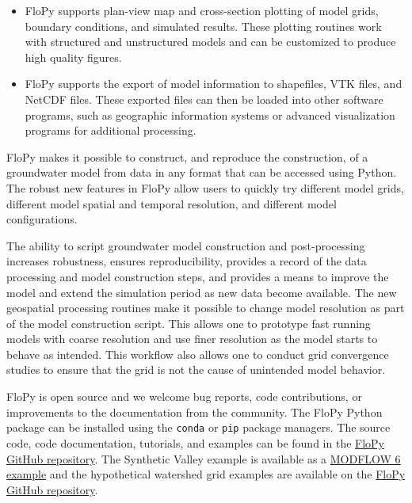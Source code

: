\documentclass[12pt, oneside]{article}  	%
\begin{document}
\begin{itemize}
\item FloPy supports plan-view map and cross-section plotting of model grids, boundary conditions, and simulated results. These plotting routines work with structured and unstructured models and can be customized to produce high quality figures.

\item FloPy supports the export of model information to shapefiles, VTK files, and NetCDF files. These exported files can then be loaded into other software programs, such as geographic information systems or advanced visualization programs for additional processing.

\end{itemize}

FloPy makes it possible to construct, and reproduce the construction, of a groundwater model from data in any format that can be accessed using Python. The robust new features in FloPy allow users to quickly try different model grids, different model spatial and temporal resolution, and different model configurations. 

The ability to script groundwater model construction and post-processing increases robustness, ensures reproducibility, provides a record of the data processing and model construction steps, and provides a means to improve the model and extend the simulation period as new data become available. The new geospatial processing routines make it possible to change model resolution as part of the model construction script. This allows one to prototype fast running models with coarse resolution and use finer resolution as the model starts to behave as intended. This workflow also allows one to conduct grid convergence studies to ensure that the grid is not the cause of unintended model behavior.

FloPy is open source and we welcome bug reports, code contributions, or improvements to the documentation from the community. The FloPy Python package can be installed using the \texttt{conda} or \texttt{pip} package managers. The source code, code documentation, tutorials, and examples can be found in the \href{https://github.com/modflowpy/flopy}{FloPy GitHub repository}. The Synthetic Valley example is available as a \href{https://modflow6-examples.readthedocs.io/en/master/examples.html}{MODFLOW 6 example} and the hypothetical watershed grid examples are available on the \href{https://github.com/modflowpy/flopy/tree/develop/examples/mf6_groundwater_paper}{FloPy GitHub repository}.
\end{document}
